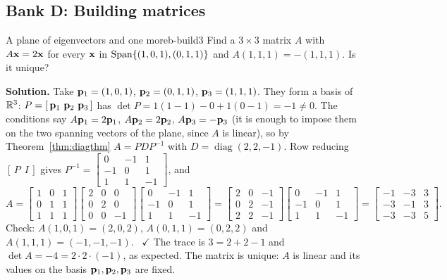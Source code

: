 \documentclass[11pt]{article}
\begin{document}
\subsection*{Bank D: Building matrices}
\begin{exmp}{A plane of eigenvectors and one more}{b-build3}
Find a $3\times3$ matrix $A$ with $A\mathbf{x}=2\mathbf{x}$ for every $\mathbf{x}$ in $\operatorname{Span}\{(1,0,1),(0,1,1)\}$ and $A(1,1,1)=-(1,1,1)$. Is it unique?

\textbf{Solution.} Take $\mathbf{p}_1=(1,0,1)$, $\mathbf{p}_2=(0,1,1)$, $\mathbf{p}_3=(1,1,1)$. They form a basis of $\mathbb{R}^3$: $P=[\,\mathbf{p}_1\ \mathbf{p}_2\ \mathbf{p}_3\,]$ has $\det P=1(1-1)-0+1(0-1)=-1\neq0$. The conditions say $A\mathbf{p}_1=2\mathbf{p}_1$, $A\mathbf{p}_2=2\mathbf{p}_2$, $A\mathbf{p}_3=-\mathbf{p}_3$ (it is enough to impose them on the two spanning vectors of the plane, since $A$ is linear), so by Theorem~\ref{thm:diagthm} $A=PDP^{-1}$ with $D=\operatorname{diag}(2,2,-1)$. Row reducing $[\,P\ \ I\,]$ gives $P^{-1}=\begin{bmatrix}0&-1&1\\-1&0&1\\1&1&-1\end{bmatrix}$, and
\[
A=\begin{bmatrix}1&0&1\\0&1&1\\1&1&1\end{bmatrix}\begin{bmatrix}2&0&0\\0&2&0\\0&0&-1\end{bmatrix}\begin{bmatrix}0&-1&1\\-1&0&1\\1&1&-1\end{bmatrix}=\begin{bmatrix}2&0&-1\\0&2&-1\\2&2&-1\end{bmatrix}\begin{bmatrix}0&-1&1\\-1&0&1\\1&1&-1\end{bmatrix}=\begin{bmatrix}-1&-3&3\\-3&-1&3\\-3&-3&5\end{bmatrix}.
\]
Check: $A(1,0,1)=(2,0,2)$, $A(0,1,1)=(0,2,2)$ and $A(1,1,1)=(-1,-1,-1)$. \ $\checkmark$ The trace is $3=2+2-1$ and $\det A=-4=2\cdot2\cdot(-1)$, as expected. The matrix is unique: $A$ is linear and its values on the basis $\mathbf{p}_1,\mathbf{p}_2,\mathbf{p}_3$ are fixed.
\end{exmp}
\end{document}
